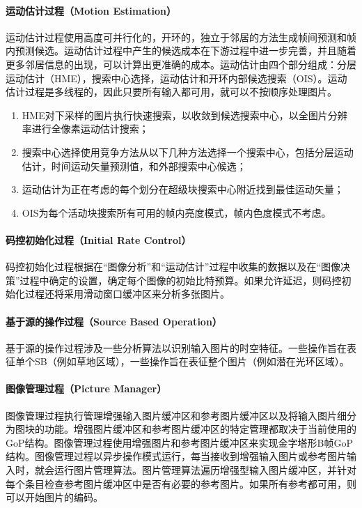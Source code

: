   \paragraph{运动估计过程（Motion Estimation）} 运动估计过程使用高度可并行化的，开环的，独立于邻居的方法生成帧间预测和帧内预测候选。运动估计过程中产生的候选成本在下游过程中进一步完善，并且随着更多邻居信息的出现，可以计算出更准确的成本。运动估计由四个部分组成：分层运动估计（HME），搜索中心选择，运动估计和开环内部候选搜索（OIS）。运动估计过程是多线程的，因此只要所有输入都可用，就可以不按顺序处理图片。
  \begin{enumerate} [label=\arabic*)]
    \item HME对下采样的图片执行快速搜索，以收敛到候选搜索中心，以全图片分辨率进行全像素运动估计搜索；
    \item 搜索中心选择使用竞争方法从以下几种方法选择一个搜索中心，包括分层运动估计，时间运动矢量预测值，和外部搜索中心候选；
    \item 运动估计为正在考虑的每个划分在超级块搜索中心附近找到最佳运动矢量；
    \item OIS为每个活动块搜索所有可用的帧内亮度模式，帧内色度模式不考虑。
  \end{enumerate}

  \paragraph{码控初始化过程（Initial Rate Control）} 码控初始化过程根据在“图像分析”和“运动估计”过程中收集的数据以及在“图像决策”过程中确定的设置，确定每个图像的初始比特预算。如果允许延迟，则码控初始化过程还将采用滑动窗口缓冲区来分析多张图片。

  \paragraph{基于源的操作过程（Source Based Operation）} 基于源的操作过程涉及一些分析算法以识别输入图片的时空特征。一些操作旨在表征单个SB（例如草地区域），一些操作旨在表征整个图片（例如潜在光环区域）。

  \paragraph{图像管理过程（Picture Manager）} 图像管理过程执行管理增强输入图片缓冲区和参考图片缓冲区以及将输入图片细分为图块的功能。增强图片缓冲区和参考图片缓冲区的特定管理都取决于当前使用的GoP结构。图像管理过程使用增强图片和参考图片缓冲区来实现金字塔形B帧GoP结构。图像管理过程以异步操作模式运行，每当接收到增强输入图片或参考图片输入时，就会运行图片管理算法。图片管理算法遍历增强型输入图片缓冲区，并针对每个条目检查参考图片缓冲区中是否有必要的参考图片。如果所有参考都可用，则可以开始图片的编码。

